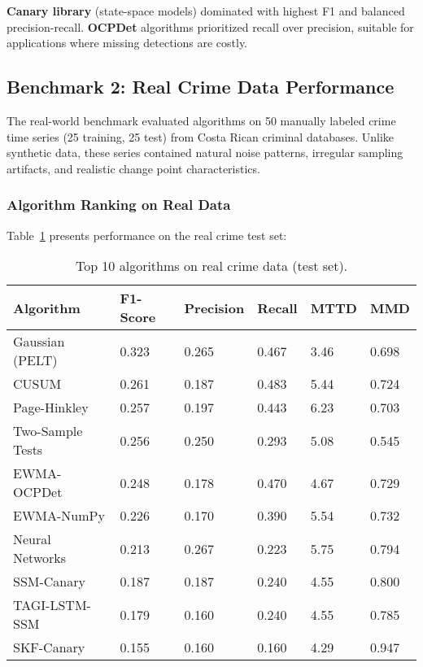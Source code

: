 \textbf{Canary library} (state-space models) dominated with highest F1 and balanced precision-recall. \textbf{OCPDet} algorithms prioritized recall over precision, suitable for applications where missing detections are costly.

\subsection{Benchmark 2: Real Crime Data Performance}

The real-world benchmark evaluated algorithms on 50 manually labeled crime time series (25 training, 25 test) from Costa Rican criminal databases. Unlike synthetic data, these series contained natural noise patterns, irregular sampling artifacts, and realistic change point characteristics.

\subsubsection{Algorithm Ranking on Real Data}

Table~\ref{tab:ranking_real} presents performance on the real crime test set:

\begin{table}[H]
\caption{Top 10 algorithms on real crime data (test set).\label{tab:ranking_real}}
\begin{tabularx}{\textwidth}{lXXXXX}
\toprule
\textbf{Algorithm} & \textbf{F1-Score} & \textbf{Precision} & \textbf{Recall} & \textbf{MTTD} & \textbf{MMD} \\
\midrule
Gaussian (PELT) & 0.323 & 0.265 & 0.467 & 3.46 & 0.698 \\
CUSUM & 0.261 & 0.187 & 0.483 & 5.44 & 0.724 \\
Page-Hinkley & 0.257 & 0.197 & 0.443 & 6.23 & 0.703 \\
Two-Sample Tests & 0.256 & 0.250 & 0.293 & 5.08 & 0.545 \\
EWMA-OCPDet & 0.248 & 0.178 & 0.470 & 4.67 & 0.729 \\
EWMA-NumPy & 0.226 & 0.170 & 0.390 & 5.54 & 0.732 \\
Neural Networks & 0.213 & 0.267 & 0.223 & 5.75 & 0.794 \\
SSM-Canary & 0.187 & 0.187 & 0.240 & 4.55 & 0.800 \\
TAGI-LSTM-SSM & 0.179 & 0.160 & 0.240 & 4.55 & 0.785 \\
SKF-Canary & 0.155 & 0.160 & 0.160 & 4.29 & 0.947 \\
\bottomrule
\end{tabularx}
\end{table}


